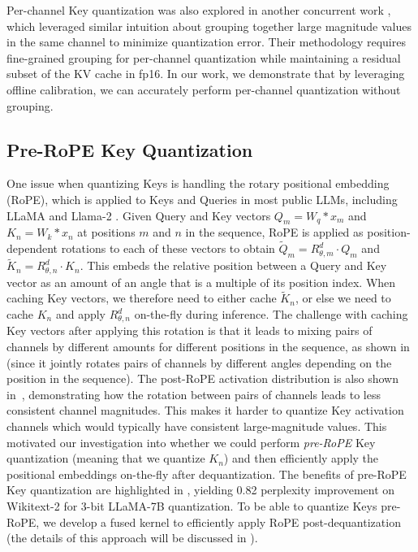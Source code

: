 Per-channel Key quantization was also explored in another concurrent work \cite{kivi}, which leveraged similar intuition about grouping together large magnitude values in the same channel to minimize quantization error. Their methodology requires fine-grained grouping for per-channel quantization while maintaining a residual subset of the KV cache in fp16. In our work, we demonstrate that by leveraging offline calibration, we can accurately perform per-channel quantization without grouping.

\subsection{Pre-RoPE Key Quantization}
\label{sec:method-rope}

One issue when quantizing Keys is handling the rotary positional embedding (RoPE), which is applied to Keys and Queries in most public LLMs, including LLaMA and Llama-2 \cite{su2023roformer}. Given Query and Key vectors $Q_m = W_q*x_m$ and $K_n = W_k*x_n$ at positions $m$ and $n$ in the sequence, RoPE is applied as position-dependent rotations to each of these vectors to obtain $\tilde{Q}_m = R^d_{\theta,m}\cdot Q_m$ and $\tilde{K}_n = R^d_{\theta,n}\cdot
    K_n$. 
This embeds the relative position between a Query and Key vector as an amount of an angle that is a multiple of its position index. When caching Key vectors, we therefore need to either cache $\tilde{K}_n$, or else we need to cache $K_n$ and apply $R^d_{\theta,n}$ on-the-fly during inference. The challenge with caching Key vectors after applying this rotation is that it leads to mixing pairs of channels by different amounts for different positions in the sequence, as shown in  (since it jointly rotates pairs of channels by different angles depending on the position in the sequence). The post-RoPE activation distribution is also shown in~, demonstrating how the rotation between pairs of channels leads to less consistent channel magnitudes. This makes it harder to quantize Key activation channels which would typically have consistent large-magnitude values. This motivated our investigation into whether we could perform \textit{pre-RoPE} Key quantization (meaning that we quantize $K_n$) and then efficiently apply the positional embeddings on-the-fly after dequantization. The benefits of pre-RoPE Key quantization are highlighted in , yielding 0.82 perplexity improvement on Wikitext-2 for 3-bit LLaMA-7B quantization. To be able to quantize Keys pre-RoPE, we develop a fused kernel to efficiently apply RoPE post-dequantization (the details of this approach will be discussed in ). 

